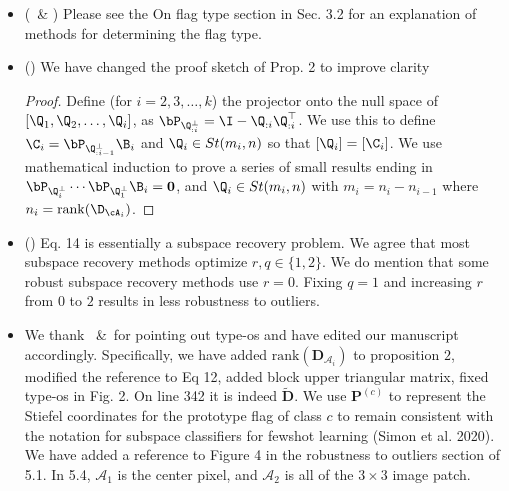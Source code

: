 \documentclass[10pt,twocolumn,letterpaper]{article}
\begin{document}
\begin{itemize}
    \item (\Rone~\& \Rtwo) Please see the On flag type section in Sec. 3.2 for an explanation of methods for determining the flag type.
    \item (\Rtwo) We have changed the proof sketch of Prop. 2 to improve clarity
    \begin{proof}
        Define (for $i=2,3,\dots,k$) the projector onto the null space of $[\Q_1,\Q_2,\dots,\Q_i]$, as $\bP_{\Q_{:i}^\perp} = \I - \Q_{:i}\Q_{:i}^\top$. We use this to define $\C_i = \bP_{\Q_{:i-1}^\perp}\B_i$ and $\Q_i \in St(m_i,n)$ so that $[\Q_i] = [\C_i]$. We use mathematical induction to prove a series of small results ending in $\bP_{\Q_i^\perp} \cdots\bP_{\Q_1^\perp} \B_i = \bm{0}$, and $\Q_i \in St(m_i,n)$ with $m_i = n_i - n_{i-1}$ where $n_i = \mathrm{rank}(\D_{\cA_i})$.
    \end{proof}
    \item (\Rtwo) Eq. 14 is essentially a subspace recovery problem. We agree that most subspace recovery methods optimize $r,q \in \{1,2\}$. We do mention that some robust subspace recovery methods use $r=0$. Fixing $q=1$ and increasing $r$ from $0$ to $2$ results in less robustness to outliers.
    \item We thank \Rtwo~\&~\Rfour for pointing out type-os and have edited our manuscript accordingly. Specifically, we have added $\mathrm{rank}(\mathbf{D}_{\mathcal{A}_i})$ to proposition $2$, modified the reference to Eq 12, added block upper triangular matrix, fixed type-os in Fig. 2. On line 342 it is indeed $\tilde{\mathbf{D}}$. We use $\mathbf{P}^{(c)}$ to represent the Stiefel coordinates for the prototype flag of class $c$ to remain consistent with the notation for subspace classifiers for fewshot learning (Simon et al. 2020). We have added a reference to Figure 4 in the robustness to outliers section of 5.1. In 5.4, $\mathcal{A}_1$ is the center pixel, and $\mathcal{A}_2$ is all of the $3 \times 3$ image patch.
\end{itemize}
\end{document}
